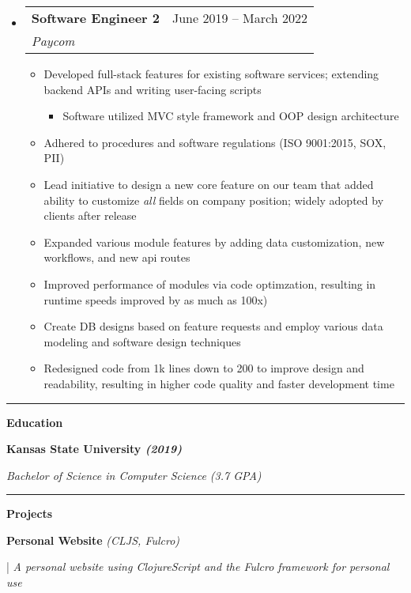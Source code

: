 \documentclass[letterpaper,11pt]{article}
\makeatletter
\newcommand{\resumeItem}[1]{
  \item\small{
    {#1 \vspace{-2pt}}
  }
}
\newcommand{\resumeSubheading}[4]{
  \vspace{-2pt}\item
    \begin{tabular*}{0.97\textwidth}[t]{l@{\extracolsep{\fill}}r}
      \textbf{#1} & #2 \\
      \textit{\small#3} & \textit{\small #4} \\
    \end{tabular*}\vspace{0pt}
}
\newcommand{\resumeSubHeadingListStart}{\begin{itemize}[leftmargin=0.15cm, label={}]}
\newcommand{\resumeSubHeadingListEnd}{\end{itemize}}
\newcommand{\resumeItemListStart}{\begin{itemize}}
\newcommand{\resumeItemListEnd}{\end{itemize}\vspace{-5pt}}
\makeatother
\begin{document}
\resumeSubHeadingListStart
\resumeSubheading
{Software Engineer 2}{June 2019 – March 2022}
{Paycom}{}
\resumeItemListStart
\resumeItem{ Developed full-stack features for existing software services; extending backend APIs and writing user-facing scripts}
  \begin{itemize}
    \item Software utilized MVC style framework and OOP design architecture
  \end{itemize}
\resumeItem{ Adhered to procedures and software regulations (ISO 9001:2015, SOX, PII)}
\resumeItem{ Lead initiative to design a new core feature on our team that added ability to customize \textit{all} fields on company position; widely adopted by clients after release }
\resumeItem{ Expanded various module features by adding data customization, new workflows, and new api routes}
\resumeItem{ Improved performance of modules via code optimzation, resulting in runtime speeds improved by as much as 100x)}
\resumeItem{ Create DB designs based on feature requests and employ various data modeling and software design techniques}
\resumeItem{ Redesigned code from 1k lines down to 200 to improve design and readability, resulting in higher code quality and faster development time }
\resumeItemListEnd
\resumeSubHeadingListEnd
\noindent\rule{19.5cm}{0.4pt}

\textbf{\large \textcolor{magic_blue}{Education}}

\begin{minipage}[t]{0.45\textwidth}
    \raggedright
    \textbf{ Kansas State University \textit{(2019)}} \\
\end{minipage}
\hfill
\begin{minipage}[t]{0.45\textwidth}
    \raggedleft
    \textit{Bachelor of Science in Computer Science (3.7 GPA)} \\
\end{minipage}
\noindent\rule{19.5cm}{0.4pt}

\textbf{\large \textcolor{magic_blue}{Projects}}

\begin{minipage}[t]{0.28\textwidth}
    \raggedright
    \textbf{ Personal Website }\textit{(CLJS, Fulcro)} \\
\end{minipage}
\hfill
\begin{minipage}[t]{0.70\textwidth}
    \raggedright
    |\textit{ A personal website using ClojureScript and the Fulcro framework for personal use} \\
\end{minipage}
\end{document}
